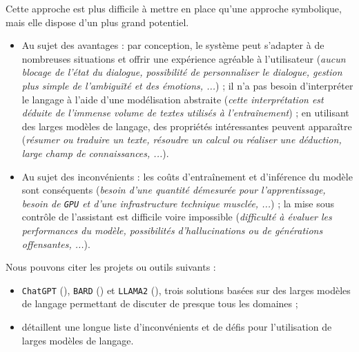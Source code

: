 			
			Cette approche est plus difficile à mettre en place qu'une approche symbolique, mais elle dispose d'un plus grand potentiel.
			\begin{itemize}
				\item[\faThumbsUp] Au sujet des avantages :
					par conception, le système peut s'adapter à de nombreuses situations et offrir une expérience agréable à l'utilisateur
					(\textit{aucun blocage de l'état du dialogue, possibilité de personnaliser le dialogue, gestion plus simple de l'ambiguïté et des émotions, ...}) ;
					il n'a pas besoin d'interpréter le langage à l'aide d'une modélisation abstraite
					(\textit{cette interprétation est déduite de l'immense volume de textes utilisés à l’entraînement}) ;
					en utilisant des larges modèles de langage, des propriétés intéressantes peuvent apparaître
					(\textit{résumer ou traduire un texte, résoudre un calcul ou réaliser une déduction, large champ de connaissances, ...}).
				\item[\faThumbsDown] Au sujet des inconvénients :
					les coûts d'entraînement et d'inférence du modèle sont conséquents
					(\textit{besoin d'une quantité démesurée pour l'apprentissage, besoin de \texttt{GPU} et d'une infrastructure technique musclée, ...}) ;
					la mise sous contrôle de l'assistant est difficile voire impossible
					(\textit{difficulté à évaluer les performances du modèle, possibilités d'hallucinations ou de générations offensantes, ...}).
			\end{itemize}
			
			\begin{leftBarExamples}
				Nous pouvons citer les projets ou outils suivants :
				\begin{itemize}
					\item \texttt{ChatGPT} (\cite{openai:2023:chatgpt}), \texttt{BARD} (\cite{google:2023:bard-chat-based}) et \texttt{LLAMA2} (\cite{touvron-etal:2023:llama-open-foundation}), trois solutions basées sur des larges modèles de langage permettant de discuter de presque tous les domaines ;
					\item \cite{kaddour-etal:2023:challenges-applications-large} détaillent une longue liste d'inconvénients et de défis pour l'utilisation de larges modèles de langage.
				\end{itemize}
			\end{leftBarExamples}
	
